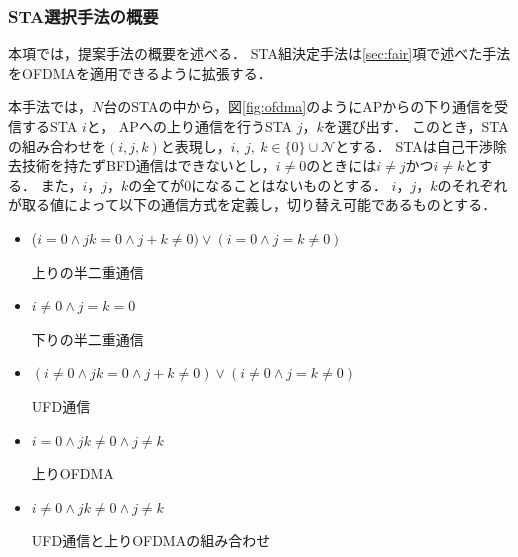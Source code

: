 \documentclass[master]{kuisthesis}		%
\newcommand{\mN}{{\mathcal N}}
\newcommand{\sijk}{(i,j,k)}
\begin{document}
			\subsubsection{STA選択手法の概要}\label{sec:pair_def}
				本項では，提案手法の概要を述べる．
				STA組決定手法は\ref{sec:fair}項で述べた手法をOFDMAを適用できるように拡張する．
				\par
				本手法では，$N$台のSTAの中から，図\ref{fig:ofdma}のようにAPからの下り通信を受信するSTA $i$と，
				APへの上り通信を行うSTA $j$，$k$を選び出す．
				このとき，STAの組み合わせを$\sijk$と表現し，$i,\ j,\ k \in \{0\}\cup \mN$とする．
				STAは自己干渉除去技術を持たずBFD通信はできないとし，$i\neq0$のときには$i\neq j$かつ$i\neq k$とする．
				また，$i$，$j$，$k$の全てが0になることはないものとする．
				$i$，$j$，$k$のそれぞれが取る値によって以下の通信方式を定義し，切り替え可能であるものとする．
				\begin{itemize}%
					\item ($i=0\land jk=0\land j+k\neq0)\lor (i=0\land j=k\neq0)$\par
					\hspace*{15pt}上りの半二重通信
					\item $i\neq0\land j=k=0$\par
					\hspace*{15pt}下りの半二重通信
					\item $(i\neq0\land jk=0 \land j+k\neq0)\lor(i\neq0\land j=k\neq0)$\par
					\hspace*{15pt}UFD通信
					\item $i=0\land jk\neq0 \land j\neq k$\par
					\hspace*{15pt}上りOFDMA
					\item $i\neq0 \land jk\neq0 \land j\neq k$\par
					\hspace*{15pt}UFD通信と上りOFDMAの組み合わせ
				\end{itemize}
				\par
\end{document}
